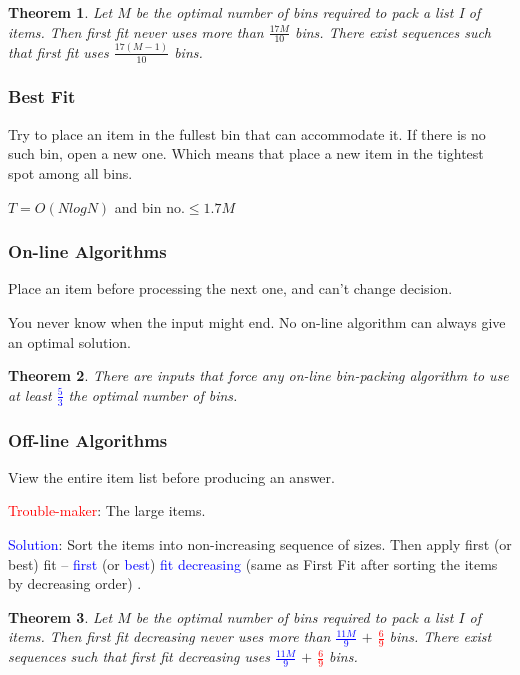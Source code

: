 \documentclass{article}
\newtheorem*{Theorem}{Theorem}
\begin{document}
\begin{Theorem}
    Let $M$ be the optimal number of bins required to pack a list I of items.  Then first fit never uses more than $\frac{17M}{10}$ bins. There exist sequences such that first fit uses $\frac{17(M-1)}{10}$ bins.
\end{Theorem}

\subsubsection{Best Fit}
Try to place an item in the fullest bin that can accommodate it. If there is no such bin, open a new one. Which means that place a new item in the tightest spot among all bins.\par

$T = O( N log N )$ and bin no.$\le  1.7M$

\subsubsection{On-line Algorithms}
Place an item before processing the next one, and can't change decision.\par
You never know when the input might end.  No on-line algorithm can always give an optimal solution.

\begin{Theorem}
    There are inputs that force any on-line bin-packing algorithm to use at least \textcolor{blue}{$\frac{5}{3}$} the optimal number of bins.
\end{Theorem}

\subsubsection{Off-line Algorithms}
View the entire item list before producing an answer.\par

\textcolor{red}{Trouble-maker}: The large items.\par
\textcolor{blue}{Solution}: Sort the items into non-increasing sequence of sizes.  Then apply first (or best) fit – \textcolor{blue}{first} (or \textcolor{blue}{best}) \textcolor{blue}{fit decreasing} (same as First Fit after sorting the items by decreasing order) .

\begin{Theorem}
    Let $M$ be the optimal number of bins required to pack a list $I$ of items.  Then first fit decreasing never uses more than \textcolor{blue}{$\frac{11M}{9}$} $+$ \textcolor{red}{$\frac{6}{9}$} bins.  There exist sequences such that first fit decreasing uses \textcolor{blue}{$\frac{11M}{9}$} $+$ \textcolor{red}{$\frac{6}{9}$} bins.
\end{Theorem}
\end{document}
